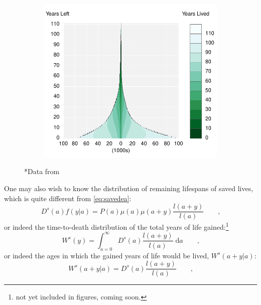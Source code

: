 \documentclass{article}
\newcommand{\dd}{\; \mathrm{d}}
\newcommand{\tc}{\quad\quad\text{,}}
\begin{document}
\begin{figure}
\begin{subfigure}[b]{.48\linewidth}
    \includegraphics[scale=.55]{Figures/Deathsyx10.pdf}
\end{subfigure}
\caption*{*Data from }
\end{figure}
\FloatBarrier
One may also wish to know the distribution of remaining lifespans of saved
lives, which is quite different from \eqref{eq:savedea}:
\begin{equation}
\label{eq:savedy}
D^s(a)f(y|a) = P(a)\mu(a)\mu(a+y) \frac{l(a+y)}{l(a)} \tc
\end{equation}
or indeed the time-to-death distribution of the total years of life
gained:\footnote{not yet included in figures, coming soon.}
\begin{equation}
\label{eq:gainedy}
W^s(y) = \int_{a=0}^\infty D^s(a)\frac{l(a+y)}{l(a)} \dd a \tc
\end{equation}
or indeed the ages in which the gained years of life would be lived,
$W^s(a+y|a)$:
\begin{equation}
\label{eq:gaineday}
W^s(a+y|a) = D^s(a)\frac{l(a+y)}{l(a)} \tc
\end{equation}
\end{document}
